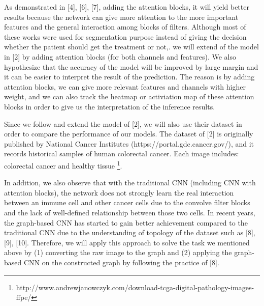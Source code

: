 \documentclass[letterpaper, 10 pt, journal]{ieeeconf}
\begin{document}
	As demonstrated in [4], [6], [7], adding the attention blocks, it will yield better results because the network can give more attention to the 
	more important features and the general interaction among blocks of filters. Although most of these works were used for segmentation purpose instead 
	of giving the decision whether the patient should get the treatment or not,.  we will extend of the model in [2] by adding attention blocks (for both channels 
	and features). We also hypothesize that the accuracy of the model will be improved by large margin and it can be easier to interpret the result of the 
	prediction. The reason is by adding attention blocks, we can give more relevant features and channels with higher weight, and we can also track the heatmap or 
	activiation map of these attention blocks in order to give us the interpretation of the inference results.
	
	Since we follow and extend the model of [2], we will also use their dataset in order to compare the performance of our models. The dataset of [2] 
	is originally published by National Cancer Institutes (https://portal.gdc.cancer.gov/), and it records historical samples of human colorectal cancer. 
	Each image includes: colorectal cancer and healthy tissue
	\footnote{http://www.andrewjanowczyk.com/download-tcga-digital-pathology-images-ffpe/}.
	
	In addition, we also observe that with the traditional CNN (including CNN with attention blocks), the network does not strongly learn the real 
	interaction between an immune cell and other cancer cells due to the convolve filter blocks and the lack of well-defined relationship between those 
	two cells.  In recent years, the graph-based CNN has started to gain better achievement compared to the traditional CNN due to the understanding of 
	topology of the dataset such as [8], [9], [10]. Therefore, we will apply this approach to solve the task we mentioned above by (1) converting the raw 
	image to the graph and (2) applying the graph-based CNN on the constructed graph by following the practice of [8].
	
	\cleardoublepage
	
	
\end{document}
